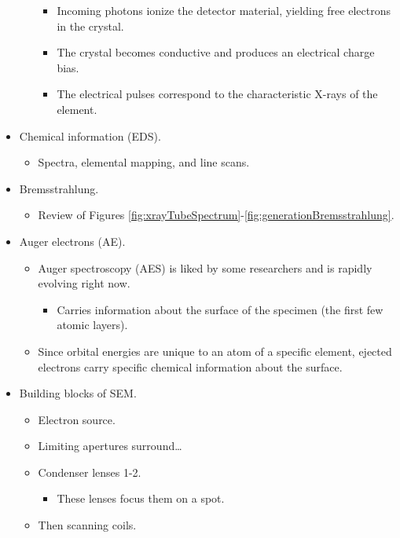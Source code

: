 \documentclass[../notes.tex]{subfiles}
\begin{document}
\begin{itemize}
\begin{itemize}
        \begin{itemize}
            \item Incoming photons ionize the detector material, yielding free electrons in the crystal.
            \item The crystal becomes conductive and produces an electrical charge bias.
            \item The electrical pulses correspond to the characteristic X-rays of the element.
        \end{itemize}
    \end{itemize}
    \item Chemical information (EDS).
    \begin{itemize}
        \item Spectra, elemental mapping, and line scans.
    \end{itemize}
    \item Bremsstrahlung.
    \begin{itemize}
        \item Review of Figures \ref{fig:xrayTubeSpectrum}-\ref{fig:generationBremsstrahlung}.
    \end{itemize}
    \item Auger electrons (AE).
    \begin{itemize}
        \item Auger spectroscopy (AES) is liked by some researchers and is rapidly evolving right now.
        \begin{itemize}
            \item Carries information about the surface of the specimen (the first few atomic layers).
        \end{itemize}
        \item Since orbital energies are unique to an atom of a specific element, ejected electrons carry specific chemical information about the surface.
    \end{itemize}
    \item Building blocks of SEM.
    \begin{itemize}
        \item Electron source.
        \item Limiting apertures surround\dots
        \item Condenser lenses 1-2.
        \begin{itemize}
            \item These lenses focus them on a spot.
        \end{itemize}
        \item Then scanning coils.

\end{itemize}
\end{itemize}
\end{document}
